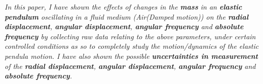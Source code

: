 \textit{In this paper, I have shown the effects of changes in the \textbf{mass} in an \textbf{elastic pendulum} oscillating in a fluid medium (Air(Damped motion)) on the \textbf{radial displacement}, \textbf{angular displacement}, \textbf{angular frequency} and \textbf{absolute frequency} by collecting raw data relating to the above parameters, under certain controlled conditions as so to completely study the motion/dynamics of the elastic pendula motion. I have also shown the possible \textbf{uncertainties in measurement} of the \textbf{radial displacement}, \textbf{angular displacement}, \textbf{angular frequency} and \textbf{absolute frequency}.}


